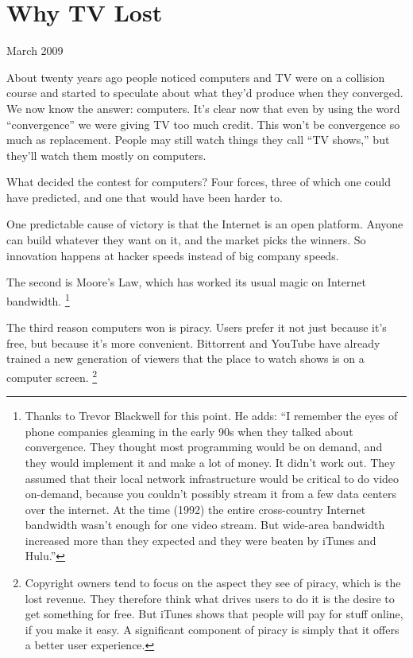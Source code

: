 \chapter{Why TV Lost}

March 2009

About twenty years ago people noticed computers and TV were on a
collision course and started to speculate about what they'd produce when
they converged. We now know the answer: computers. It's clear now that
even by using the word ``convergence'' we were giving TV too much
credit. This won't be convergence so much as replacement. People may
still watch things they call ``TV shows,'' but they'll watch them mostly
on computers.

What decided the contest for computers? Four forces, three of which one
could have predicted, and one that would have been harder to.

One predictable cause of victory is that the Internet is an open
platform. Anyone can build whatever they want on it, and the market
picks the winners. So innovation happens at hacker speeds instead of big
company speeds.

The second is Moore's Law, which has worked its usual magic on Internet
bandwidth. \footnote{Thanks to Trevor Blackwell for this point. He adds: ``I remember
the eyes of phone companies gleaming in the early 90s when they talked
about convergence. They thought most programming would be on demand, and
they would implement it and make a lot of money. It didn't work out.
They assumed that their local network infrastructure would be critical
to do video on-demand, because you couldn't possibly stream it from a
few data centers over the internet. At the time (1992) the entire
cross-country Internet bandwidth wasn't enough for one video stream. But
wide-area bandwidth increased more than they expected and they were
beaten by iTunes and Hulu.''}

The third reason computers won is piracy. Users prefer it not just
because it's free, but because it's more convenient. Bittorrent and
YouTube have already trained a new generation of viewers that the place
to watch shows is on a computer screen. \footnote{Copyright owners tend to focus on the aspect they see of piracy,
which is the lost revenue. They therefore think what drives users to do
it is the desire to get something for free. But iTunes shows that people
will pay for stuff online, if you make it easy. A significant component
of piracy is simply that it offers a better user experience.}

